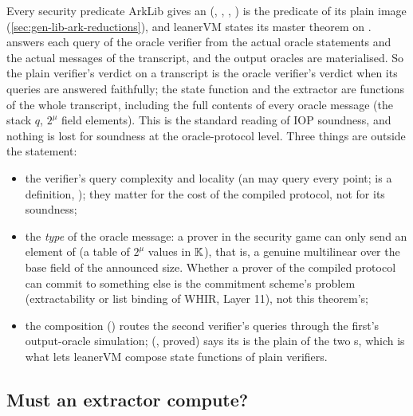 Every security predicate ArkLib gives an  (\allowbreak{},
, ,
\allowbreak{}) is the predicate of its plain image 
(\cref{sec:gen-lib-ark-reductions}), and leanerVM states its master theorem on
\allowbreak{}.  answers each query of the oracle verifier
from the actual oracle statements and the actual messages of the transcript, and the output
oracles are materialised. So the plain verifier's verdict on a transcript is the oracle verifier's
verdict when its queries are answered faithfully; the state function and the extractor are
functions of the whole transcript, including the full contents of every oracle message (the stack
$q$, $2^{\mu}$ field elements). This is the standard reading of IOP soundness, and nothing is lost
for soundness at the oracle-protocol level. Three things are outside the statement:
\begin{itemize}
\item the verifier's query complexity and locality (an  may query every
  point;  is a  definition, );
  they matter for the cost of the compiled protocol, not for its soundness;
\item the \emph{type} of the oracle message: a prover in the security game can only send an element
  of  (a table of $2^{\mu}$ values in $\mathbb{K}$), that is, a genuine multilinear over
  the base field of the announced size. Whether a prover of the compiled protocol can commit to
  something else is the commitment scheme's problem (extractability or list binding of WHIR,
  Layer 11), not this theorem's;
\item the composition  (\allowbreak{}) routes the
  second verifier's queries through the first's output-oracle simulation;
   (, proved) says its  is the plain
   of the two s, which is what lets leanerVM compose state
  functions of plain verifiers.
\end{itemize}

\subsection{Must an extractor compute?}\label{sec:gen-lib-ark-extractors}

